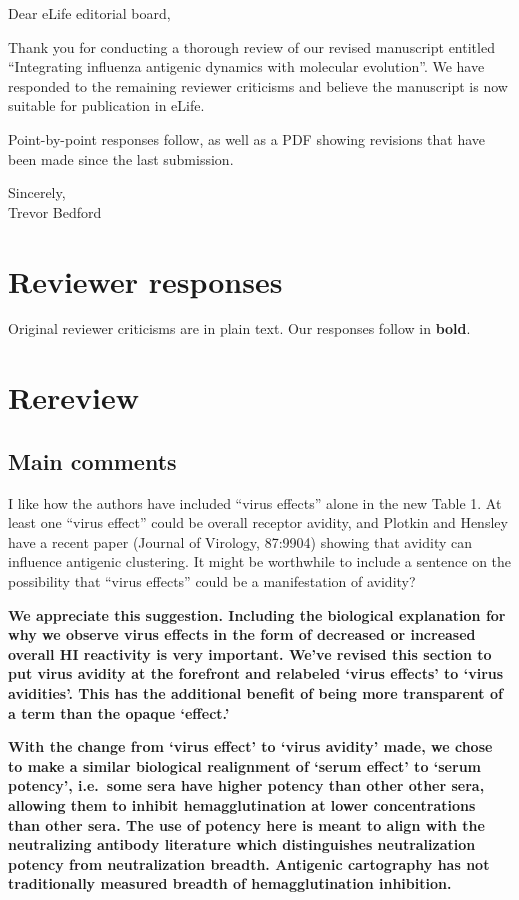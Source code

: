 \documentclass[11pt,oneside,letterpaper]{article}
\begin{document}

Dear eLife editorial board,

Thank you for conducting a thorough review of our revised manuscript entitled ``Integrating influenza antigenic dynamics with molecular evolution''.  We have responded to the remaining reviewer criticisms and believe the manuscript is now suitable for publication in eLife.

Point-by-point responses follow, as well as a PDF showing revisions that have been made since the last submission.

Sincerely,\\
Trevor Bedford

\restoregeometry

\newpage

\section*{Reviewer responses}

Original reviewer criticisms are in plain text.  Our responses follow in \textbf{bold}.  

\section*{Rereview}

\subsection*{Main comments}

I like how the authors have included ``virus effects'' alone in the new Table 1. At least one ``virus effect'' could be overall receptor avidity, and Plotkin and Hensley have a recent paper (Journal of Virology, 87:9904) showing that avidity can influence antigenic clustering. It might be worthwhile to include a sentence on the possibility that ``virus effects'' could be a manifestation of avidity? 

\textbf{We appreciate this suggestion.  Including the biological explanation for why we observe virus effects in the form of decreased or increased overall HI reactivity is very important.  We've revised this section to put virus avidity at the forefront and relabeled `virus effects' to `virus avidities'.  This has the additional benefit of being more transparent of a term than the opaque `effect.'}

\textbf{With the change from `virus effect' to `virus avidity' made, we chose to make a similar biological realignment of `serum effect' to `serum potency', i.e.\ some sera have higher potency than other other sera, allowing them to inhibit hemagglutination at lower concentrations than other sera.  The use of potency here is meant to align with the neutralizing antibody literature which distinguishes neutralization potency from neutralization breadth.  Antigenic cartography has not traditionally measured breadth of hemagglutination inhibition.}
\end{document}
